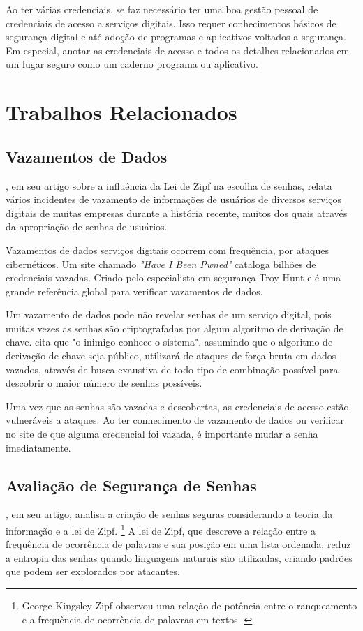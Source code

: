 \documentclass[12pt]{article}
\begin{document}
Ao ter várias credenciais, se faz necessário ter uma boa gestão pessoal de credenciais
de acesso a serviços digitais.
Isso requer conhecimentos básicos de segurança digital e até adoção de programas e
aplicativos voltados a segurança.
Em especial, anotar as credenciais de acesso e todos os detalhes relacionados em um
lugar seguro como um caderno programa ou aplicativo.

\section{Trabalhos Relacionados}

\subsection{Vazamentos de Dados}

\cite{article:1}, em seu artigo sobre a influência da Lei de Zipf na
escolha de senhas, relata vários incidentes de vazamento de informações de
usuários de diversos serviços digitais de muitas empresas durante a história
recente, muitos dos quais através da apropriação de senhas de usuários.

Vazamentos de dados serviços digitais ocorrem com frequência, por ataques
cibernéticos.
Um site chamado \textit{"Have I Been Pwned"} \cite{hibp} cataloga bilhões de
credenciais vazadas.
Criado pelo especialista em segurança Troy Hunt e é uma grande referência global
para verificar vazamentos de dados.

Um vazamento de dados pode não revelar senhas de um serviço digital, pois muitas
vezes as senhas são criptografadas por algum algoritmo de derivação de chave.
\cite{article:1} cita que "o inimigo conhece o sistema", assumindo que o algoritmo
de derivação de chave seja público, utilizará de ataques de força bruta em dados
vazados, através de busca exaustiva de todo tipo de combinação possível para
descobrir o maior número de senhas possíveis.

Uma vez que as senhas são vazadas e descobertas, as credenciais de acesso estão
vulneráveis a ataques.
Ao ter conhecimento de vazamento de dados ou verificar no site de \cite{hibp} que
alguma credencial foi vazada, é importante mudar a senha imediatamente.

\subsection{Avaliação de Segurança de Senhas}

\cite{article:1}, em seu artigo, analisa a criação de senhas seguras considerando
a teoria da informação e a lei de Zipf.
\footnote{
  George Kingsley Zipf observou uma relação de potência entre o ranqueamento e a
  frequência de ocorrência de palavras em textos. \cite{article:1}
}
A lei de Zipf, que descreve a relação entre a frequência de ocorrência de
palavras e sua posição em uma lista ordenada, reduz a entropia das senhas
quando linguagens naturais são utilizadas, criando padrões que podem ser
explorados por atacantes.
\end{document}
